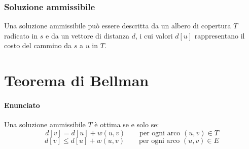 \subsubsection{Soluzione ammissibile}
Una soluzione ammissibile pu\`o essere descritta da un albero di copertura $T$ radicato in $s$ e da un vettore di distanza $d$, i cui valori $d[u]$ rappresentano il costo del cammino da
$s$ a $u$ in $T$.\\
\begin{algorithm}[H]
\DontPrintSemicolon
{}






\SetKwFunction{}{}
\SetKwFunction{}{}
\SetKwFunction{}{}
\SetKwFunction{}{}
\SetKwFunction{}{}


\caption{\protect\Void \protect{}}
\end{algorithm}
\section{Teorema di Bellman}
\paragraph{Enunciato}
Una soluzione ammissibile $T$ \`e ottima se e solo se: $$d[v] = d[u]+w(u, v) \quad\quad \text{per ogni arco }(u, v)\in T$$ $$d[v] \le d[u]+w(u, v) \quad\quad \text{per ogni arco }(u, v)
\in E$$
